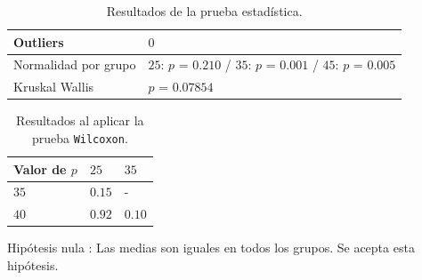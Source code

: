 \documentclass{article}
\begin{document}
\begin{table}[h!]
\centering
\caption{Resultados de la prueba estadística.}
\smallskip

\begin{tabular}{ |p{4cm}|p{8cm}|}
 \hline
 Outliers & $0$ \\
 \hline
 Normalidad por grupo & $25$: $p$ = $0.210$ / $35$: $p$ = $0.001$ / $45$: $p$ = $0.005$ \\
 \hline
 Kruskal Wallis & $p$ = $0.07854$ \\
 \hline
\end{tabular}
\label{Cuadro11}
\end{table}

\begin{table}[h!]
\centering
\caption{Resultados al aplicar la prueba \texttt{Wilcoxon}.}
\smallskip

\begin{tabular}{|p{1.7cm}|p{1.7cm}|p{1.7cm}|}
 \hline
Valor de $p$ & $25$ & $35$ \\
 \hline
 $35$ & $0.15$ & -   \\
 \hline
 $40$ & $0.92$ & $0.10$  \\
 \hline
\end{tabular}
\label{Cuadro12}
\end{table}

Hipótesis nula : Las medias son iguales en todos los grupos. Se acepta esta hipótesis.
\end{document}
